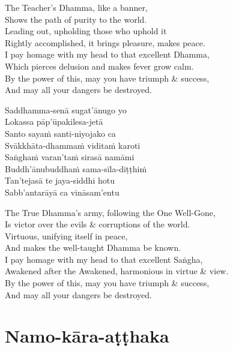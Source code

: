 \begin{english-verses}
  The Teacher's Dhamma, like a banner,\\
  Shows the path of purity to the world.\\
  Leading out, upholding those who uphold it\\
  Rightly accomplished, it brings pleasure, makes peace.\\
  I pay homage with my head to that excellent Dhamma,\\
  Which pierces delusion and makes fever grow calm.\\
  By the power of this, may you have triumph \& success,\\
  And may all your dangers be destroyed.
\end{english-verses}

\begin{pali-hang-continued}
  Saddhamma-senā sugat'ānugo yo\\
  Lokassa pāp'ūpakilesa-jetā\\
  Santo sayaṁ santi-niyojako ca\\
  Svākkhāta-dhammaṁ viditaṁ karoti\\
  Saṅghaṁ varan'taṁ sirasā namāmi\\
  Buddh'ānubuddhaṁ sama-sīla-diṭṭhiṁ\\
  Tan'tejasā te jaya-siddhi hotu\\
  Sabb'antarāyā ca vināsam'entu
\end{pali-hang-continued}

\begin{english-verses}
  The True Dhamma's army, following the One Well-Gone,\\
  Is victor over the evils \& corruptions of the world.\\
  Virtuous, unifying itself in peace,\\
  And makes the well-taught Dhamma be known.\\
  I pay homage with my head to that excellent Saṅgha,\\
  Awakened after the Awakened, harmonious in virtue \& view.\\
  By the power of this, may you have triumph \& success,\\
  And may all your dangers be destroyed.
\end{english-verses}

\suttaRef{[Thai]}



\section{Namo-kāra-aṭṭhaka}
\label{namo-kara-atthaka}

